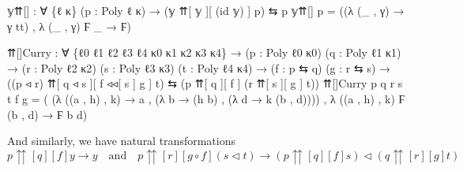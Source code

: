 \documentclass[
  11pt,
  oneside,
  article]{memoir}
\newenvironment{Shaded}{}{}
\newcommand{\NormalTok}[1]{#1}
\newcommand{\OtherTok}[1]{\textcolor[rgb]{0.00,0.44,0.13}{#1}}
\theoremstyle{definition}
\theoremstyle{plain}
\newcommand{\0}{\textsf{0}}
\newcommand{\1}{\tn{\textsf{1}}}
\begin{document}
\begin{Shaded}
\begin{Highlighting}[]
\NormalTok{𝕪⇈[] }\OtherTok{:} \OtherTok{∀} \OtherTok{\{}\NormalTok{ℓ κ}\OtherTok{\}} \OtherTok{(}\NormalTok{p }\OtherTok{:}\NormalTok{ Poly ℓ κ}\OtherTok{)} \OtherTok{→} \OtherTok{(}\NormalTok{𝕪 ⇈[ 𝕪 ][ }\OtherTok{(}\NormalTok{id 𝕪}\OtherTok{)}\NormalTok{ ] p}\OtherTok{)}\NormalTok{ ⇆ p}
\NormalTok{𝕪⇈[] p }\OtherTok{=} \OtherTok{((λ} \OtherTok{(\_}\NormalTok{ , γ}\OtherTok{)} \OtherTok{→}\NormalTok{ γ tt}\OtherTok{)}\NormalTok{ , }\OtherTok{λ} \OtherTok{(\_}\NormalTok{ , γ}\OtherTok{)}\NormalTok{ Ϝ }\OtherTok{\_} \OtherTok{→}\NormalTok{ Ϝ}\OtherTok{)}

\NormalTok{⇈[]Curry }\OtherTok{:} \OtherTok{∀} \OtherTok{\{}\NormalTok{ℓ0 ℓ1 ℓ2 ℓ3 ℓ4 κ0 κ1 κ2 κ3 κ4}\OtherTok{\}}
           \OtherTok{→} \OtherTok{(}\NormalTok{p }\OtherTok{:}\NormalTok{ Poly ℓ0 κ0}\OtherTok{)} \OtherTok{(}\NormalTok{q }\OtherTok{:}\NormalTok{ Poly ℓ1 κ1}\OtherTok{)} 
           \OtherTok{→} \OtherTok{(}\NormalTok{r }\OtherTok{:}\NormalTok{ Poly ℓ2 κ2}\OtherTok{)} \OtherTok{(}\NormalTok{s }\OtherTok{:}\NormalTok{ Poly ℓ3 κ3}\OtherTok{)} \OtherTok{(}\NormalTok{t }\OtherTok{:}\NormalTok{ Poly ℓ4 κ4}\OtherTok{)}
           \OtherTok{→} \OtherTok{(}\NormalTok{f }\OtherTok{:}\NormalTok{ p ⇆ q}\OtherTok{)} \OtherTok{(}\NormalTok{g }\OtherTok{:}\NormalTok{ r ⇆ s}\OtherTok{)}
           \OtherTok{→} \OtherTok{((}\NormalTok{p ◃ r}\OtherTok{)}\NormalTok{ ⇈[ q ◃ s ][ f ◃◃[ s ] g ] t}\OtherTok{)} 
\NormalTok{             ⇆ }\OtherTok{(}\NormalTok{p ⇈[ q ][ f ] }\OtherTok{(}\NormalTok{r ⇈[ s ][ g ] t}\OtherTok{))}
\NormalTok{⇈[]Curry p q r s t f g }\OtherTok{=} 
    \OtherTok{(} \OtherTok{(λ} \OtherTok{((}\NormalTok{a , h}\OtherTok{)}\NormalTok{ , k}\OtherTok{)} \OtherTok{→}\NormalTok{ a , }\OtherTok{(λ}\NormalTok{ b }\OtherTok{→} \OtherTok{(}\NormalTok{h b}\OtherTok{)}\NormalTok{ , }\OtherTok{(λ}\NormalTok{ d }\OtherTok{→}\NormalTok{ k }\OtherTok{(}\NormalTok{b , d}\OtherTok{))))} 
\NormalTok{    , }\OtherTok{λ} \OtherTok{((}\NormalTok{a , h}\OtherTok{)}\NormalTok{ , k}\OtherTok{)}\NormalTok{ Ϝ }\OtherTok{(}\NormalTok{b , d}\OtherTok{)} \OtherTok{→}\NormalTok{ Ϝ b d}\OtherTok{)}
\end{Highlighting}
\end{Shaded}

\noindent And similarly, we have natural transformations \[
p {\upuparrows}[q][f] y \to y \quad \text{and} \quad
p {\upuparrows}[r][g \circ f] (s \triangleleft t) \to (p {\upuparrows}[q][f] s) \triangleleft (q {\upuparrows}[r][g] t)
\]
\end{document}
